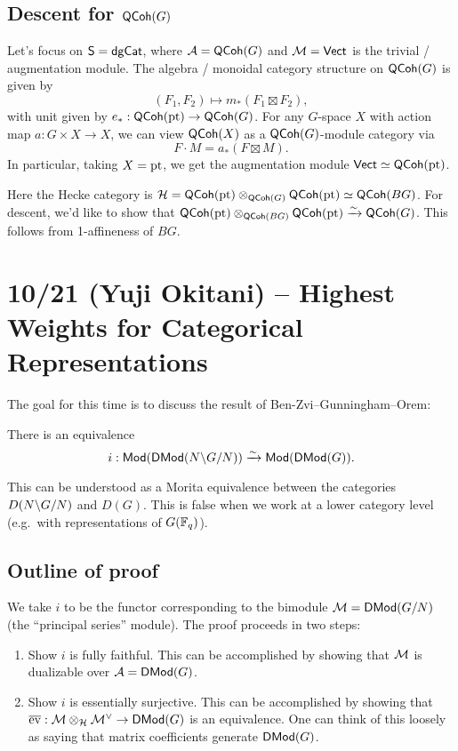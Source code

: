 \documentclass{article}
\begin{document}
\subsection{Descent for $\mathsf{QCoh}(G)$}

Let's focus on $\mathsf{S} = \mathsf{dgCat}$, where $\mathcal{A} = \mathsf{QCoh}(G)$ and $\mathcal{M} = \mathsf{Vect}$ is the trivial / augmentation module.
The algebra / monoidal category structure on $\mathsf{QCoh}(G)$ is given by
\[
	(F_1, F_2) \mapsto m_*(F_1 \boxtimes F_2),
\]
with unit given by $e_*: \mathsf{QCoh}(\operatorname{pt}) \to \mathsf{QCoh}(G)$.
For any $G$-space $X$ with action map $a: G \times X \to X$, we can view $\mathsf{QCoh}(X)$ as a $\mathsf{QCoh}(G)$-module category via
\[
	F \cdot M = a_*(F \boxtimes M).
\]
In particular, taking $X = \operatorname{pt}$, we get the augmentation module $\mathsf{Vect} \simeq \mathsf{QCoh}(\operatorname{pt})$.

Here the Hecke category is $\mathcal{H} = \mathsf{QCoh}(\operatorname{pt}) \otimes_{\mathsf{QCoh}(G)} \mathsf{QCoh}(\operatorname{pt}) \simeq \mathsf{QCoh}(BG)$.
For descent, we'd like to show that $\mathsf{QCoh}(\operatorname{pt}) \otimes_{\mathsf{QCoh}(BG)} \mathsf{QCoh}(\operatorname{pt}) \xrightarrow{\sim} \mathsf{QCoh}(G)$.
This follows from 1-affineness of $BG$.

\section{10/21 (Yuji Okitani) -- Highest Weights for Categorical Representations}

The goal for this time is to discuss the result of Ben-Zvi--Gunningham--Orem:

\begin{thm}
	There is an equivalence
	\[
		i: \mathsf{Mod}(\mathsf{DMod}(N \backslash G / N)) \xrightarrow{\sim} \mathsf{Mod}(\mathsf{DMod}(G)).
	\]
\end{thm}

This can be understood as a Morita equivalence between the categories $D(N \backslash G / N)$ and $D(G)$.
This is false when we work at a lower category level (e.g.\ with representations of $G(\mathbb{F}_q)$).

\subsection{Outline of proof}

We take $i$ to be the functor corresponding to the bimodule $\mathcal{M} = \mathsf{DMod}(G / N)$ (the ``principal series'' module).
The proof proceeds in two steps:
\begin{enumerate}
	\item Show $i$ is fully faithful.
		This can be accomplished by showing that $\mathcal{M}$ is dualizable over $\mathcal{A} = \mathsf{DMod}(G)$.
	\item Show $i$ is essentially surjective.
		This can be accomplished by showing that $\overline{\operatorname{ev}}: \mathcal{M} \otimes_{\mathcal{H}} \mathcal{M}^\vee \to \mathsf{DMod}(G)$ is an equivalence.
		One can think of this loosely as saying that matrix coefficients generate $\mathsf{DMod}(G)$.
\end{enumerate}
\end{document}
